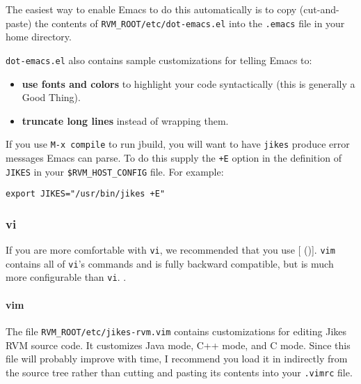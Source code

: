 The easiest way to enable Emacs to do this automatically is to copy
(cut-and-paste) the contents
of \texttt{RVM\_ROOT/etc/dot-emacs.el} into the \texttt{.emacs}
file in your home directory.

\texttt{dot-emacs.el} also contains sample customizations for telling
Emacs to: 

\begin{itemize} 
\item \textbf{use fonts and colors} to highlight your
code syntactically (this is generally a Good Thing).

\item \textbf{truncate long lines} instead of wrapping them.

\end{itemize}

If you use \texttt{M-x compile} to run jbuild, you will want to have
{\tt jikes} produce error messages Emacs can parse. To do this supply
the \texttt{+E} option in the definition of \texttt{JIKES} in your
\texttt{\$RVM\_HOST\_CONFIG} file. For example:

\begin{example}
\tt{}export JIKES="/usr/bin/jikes +E"
\end{example}

\subsubsection{vi}%
        \label{options:vi/vim}%

If you are more comfortable with {\tt vi}, we recommended that you
use [ (\texttt{\VimURL})]{\VimURL}.
\texttt{vim}
contains all of {\tt vi}'s commands and is fully backward compatible,
but is much more configurable than {\tt vi}.  .

\paragraph{vim}\label{options:vim}


The file \texttt{RVM\_ROOT/etc/jikes-rvm.vim} contains
customizations for editing Jikes RVM source code.  It customizes Java
mode, C++ mode, and C mode.  Since this file will probably improve
with time, I recommend you load it in indirectly from the source tree
rather than cutting and pasting its contents into your \texttt{.vimrc} file.

